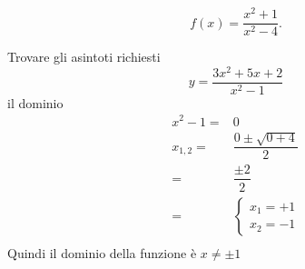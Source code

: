\begin{exercise}[no solution]
	
	\begin{equation*}
	f(x)= \frac{x^2+1}{x^2-4}.
	\end{equation*}
\end{exercise}
\begin{exercise}
	Trovare gli asintoti richiesti
\[y=\dfrac{3x^2+5x+2}{x^2-1}\]
	\tcblower
 il dominio
\begin{align*}
x^2-1=&0\\ 
x_{1,2}=&\dfrac{0\pm\sqrt{0+4}}{2}\\
=&\dfrac{\pm 2}{2}\\
=&\begin{cases}
x_1=+1\\
x_2=-1
\end{cases}\\
\end{align*}
Quindi il dominio della funzione è  $x\neq\pm1$


\end{exercise}
